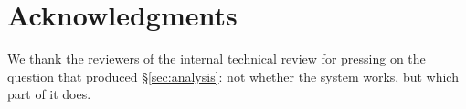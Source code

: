 \documentclass[11pt]{article}
\theoremstyle{plain}
\theoremstyle{definition}
\begin{document}
\section*{Acknowledgments}
We thank the reviewers of the internal technical review for pressing on the
question that produced \S\ref{sec:analysis}: not whether the system works, but
which part of it does.



\appendix
\clearpage

\end{document}

